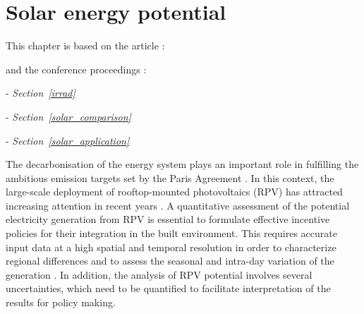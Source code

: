 \chapter{Solar energy potential}
\label{solar}

\vspace{-45pt} %
\begin{tcolorbox}[enhanced,width=\textwidth,size=fbox,
        sharp corners,colframe=black!5!white,drop fuzzy shadow southeast,
        boxrule=3mm, parbox=false] %
This chapter is based on the article \citep{walch_big_2020}:

\qquad {}

and the conference proceedings \cite{walch_spatio-temporal_2019, walch_critical_2019, walch_fast_2019-1}:

\quad {} - \textit{Section~\ref{irrad}} 

\quad {} - \textit{Section~\ref{solar_comparison}} 

\quad {} - \textit{Section~\ref{solar_application}} 
\end{tcolorbox}

The decarbonisation of the energy system plays an important role in fulfilling the ambitious emission targets set by the Paris Agreement \cite{peters_key_2017}. 
In this context, the large-scale deployment of rooftop-mounted photovoltaics (RPV) has attracted increasing attention in recent years \cite{jager-waldau_pv_2018}.
A quantitative assessment of the potential electricity generation from RPV is essential to formulate
%
effective incentive policies for their integration in the built environment. This requires accurate input data at a high spatial and temporal resolution in order to characterize regional differences and to assess the seasonal and intra-day variation of the generation \cite{bodis_high-resolution_2019}.
In addition, the analysis of RPV potential involves several uncertainties, which need to be quantified to facilitate interpretation of the results for policy making. 
 
